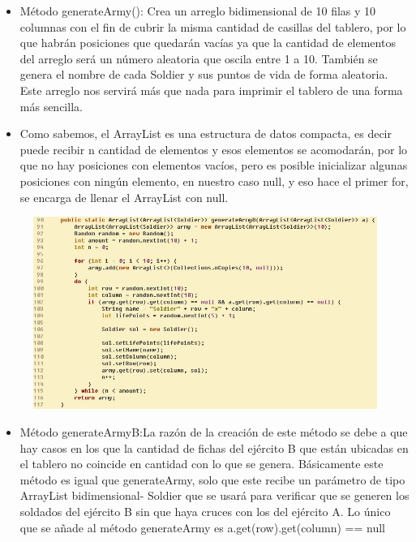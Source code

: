 \documentclass{article}
\begin{document}
	\begin{itemize}	
		
		\item Método generateArmy(): Crea un arreglo bidimensional de 10 filas y 10 columnas con
		el fin de cubrir la misma cantidad de casillas del tablero, por
		lo que habrán posiciones que quedarán vacías ya que la cantidad de elementos del arreglo será un número aleatoria que oscila entre 1 a 10. También se genera el nombre de cada Soldier y
		sus puntos de vida de forma aleatoria. Este arreglo nos servirá más que nada para imprimir el
		tablero de una forma más sencilla.
		\item Como sabemos, el ArrayList es una estructura de datos compacta, es decir puede recibir n cantidad de elementos y esos elementos se acomodarán, por lo que no hay posiciones con elementos vacíos, pero es posible inicializar algunas posiciones con ningún elemento, en nuestro caso null, y eso hace el primer for, se encarga de llenar el ArrayList con null.
	\end{itemize}
	
	
	\begin{figure}[H]
		\centering
		\includegraphics[width=1.1\textwidth,keepaspectratio]{img/generateArmyB.jpg}
	\end{figure}
	
	\begin{itemize}	
		\item Método generateArmyB:La razón de la creación de este método se debe a que hay casos en los que la cantidad de fichas del ejército B que están ubicadas en el tablero no coincide en cantidad con lo que se genera. Básicamente este método es igual que generateArmy, solo que este recibe un parámetro de tipo ArrayList bidimensional- Soldier que se usará para verificar que se generen los soldados del ejército B sin que haya cruces con los del ejército A. Lo único que se añade al método generateArmy es a.get(row).get(column) == null
	\end{itemize}
	
\end{document}
